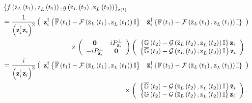 \documentclass[aps,preprint]{revtex4}%
\begin{document}
\begin{align}
&  \left\{  f\left(  \mathrm{\bar{z}}_{L}\left(  t_{1}\right)  \mathrm{,z}%
_{L}\left(  t_{1}\right)  \right)  ,g\left(  \mathrm{\bar{z}}_{L}\left(
t_{2}\right)  \mathrm{,z}_{L}\left(  t_{2}\right)  \right)  \right\}
_{\mathrm{z}\left(  t\right)  }\nonumber\\
&  =\frac{1}{\left(  \mathbf{z}_{i}^{\dagger}\mathbf{z}_{i}\right)  ^{3}%
}\left(
\begin{array}
[c]{cc}%
\mathbf{z}_{i}^{\dagger}\left\{  \overline{\mathbb{F}}\left(  t_{1}\right)
-\mathcal{F}\left(  \mathrm{\bar{z}}_{L}\left(  t_{1}\right)  \mathrm{,z}%
_{L}\left(  t_{1}\right)  \right)  \mathbb{I}\right\}  & \mathbf{\bar{z}}%
_{i}^{\dagger}\left\{  \mathbb{F}\left(  t_{1}\right)  -\mathcal{F}\left(
\mathrm{\bar{z}}_{L}\left(  t_{1}\right)  \mathrm{,z}_{L}\left(  t_{1}\right)
\right)  \mathbb{I}\right\}
\end{array}
\right) \\
&  \qquad\qquad\qquad\qquad\qquad\times\left(
\begin{array}
[c]{cc}%
\mathbf{0} & iP_{\mathbf{z}_{i}}^{\bot}\\
-iP_{\mathbf{\bar{z}}_{i}}^{\bot} & \mathbf{0}%
\end{array}
\right)  \left(
\begin{array}
[c]{c}%
\left\{  \mathbb{G}\left(  t_{2}\right)  -\mathcal{G}\left(  \mathrm{\bar{z}%
}_{L}\left(  t_{2}\right)  \mathrm{,z}_{L}\left(  t_{2}\right)  \right)
\mathbb{I}\right\}  \mathbf{z}_{i}\\
\left\{  \overline{\mathbb{G}}\left(  t_{2}\right)  -\mathcal{G}\left(
\mathrm{\bar{z}}_{L}\left(  t_{2}\right)  \mathrm{,z}_{L}\left(  t_{2}\right)
\right)  \mathbb{I}\right\}  \mathbf{\bar{z}}_{i}%
\end{array}
\right) \\
&  =\frac{i}{\left(  \mathbf{z}_{i}^{\dagger}\mathbf{z}_{i}\right)  ^{3}%
}\left(
\begin{array}
[c]{cc}%
\mathbf{z}_{i}^{\dagger}\left\{  \overline{\mathbb{F}}\left(  t_{1}\right)
-\mathcal{F}\left(  \mathrm{\bar{z}}_{L}\left(  t_{1}\right)  \mathrm{,z}%
_{L}\left(  t_{1}\right)  \right)  \mathbb{I}\right\}  & \mathbf{\bar{z}}%
_{i}^{\dagger}\left\{  \mathbb{F}\left(  t_{1}\right)  -\mathcal{F}\left(
\mathrm{\bar{z}}_{L}\left(  t_{1}\right)  \mathrm{,z}_{L}\left(  t_{1}\right)
\right)  \mathbb{I}\right\}
\end{array}
\right) \\
&  \qquad\qquad\qquad\qquad\qquad\qquad\qquad\qquad\qquad\times\left(
\begin{array}
[c]{c}%
\left\{  \overline{\mathbb{G}}\left(  t_{2}\right)  -\mathcal{G}\left(
\mathrm{\bar{z}}_{L}\left(  t_{2}\right)  \mathrm{,z}_{L}\left(  t_{2}\right)
\right)  \mathbb{I}\right\}  \mathbf{\bar{z}}_{i}\\
\left\{  \mathbb{G}\left(  t_{2}\right)  -\mathcal{G}\left(  \mathrm{\bar{z}%
}_{L}\left(  t_{2}\right)  \mathrm{,z}_{L}\left(  t_{2}\right)  \right)
\mathbb{I}\right\}  \mathbf{z}_{i}%
\end{array}
\right)  .
\end{align}
\end{document}
